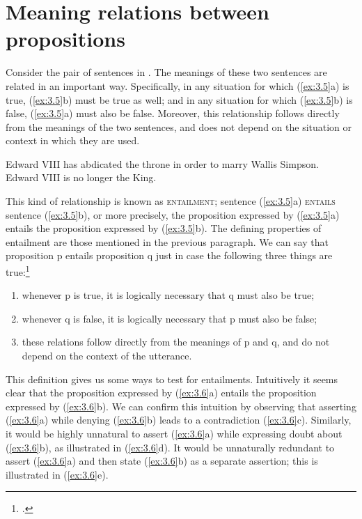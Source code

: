 \section{Meaning relations between propositions}\label{sec:3.3}

Consider the pair of sentences in . The meanings of these two sentences are related in an important way. Specifically, in any situation for which (\ref{ex:3.5}a) is true, (\ref{ex:3.5}b) must be true as well; and in any situation for which (\ref{ex:3.5}b) is false, (\ref{ex:3.5}a) must also be false. Moreover, this relationship follows directly from the meanings of the two sentences, and does not depend on the situation or context in which they are used.


\ea \label{ex:3.5}
\ea Edward VIII has abdicated the throne in order to marry Wallis Simpson.\\
\ex Edward VIII is no longer the King.
                       \z
\z


This kind of relationship is known as \textsc{entailment}; sentence (\ref{ex:3.5}a) \textsc{entails} sentence (\ref{ex:3.5}b), or more precisely, the proposition expressed by (\ref{ex:3.5}a) entails the proposition expressed by (\ref{ex:3.5}b). The defining properties of entailment are those mentioned in the previous paragraph. We can say that proposition p entails proposition q just in case the following three things are true:\footnote{\citet[29]{Cruse2000}.}


\begin{enumerate}[label=(\alph*)]
 \item whenever p is true, it is logically necessary that q must also be true;
 \item whenever q is false, it is logically necessary that p must also be false;
 \item these relations follow directly from the meanings of p and q, and do not depend on the context of the utterance.
\end{enumerate}

This definition gives us some ways to test for entailments. Intuitively it seems clear that the proposition expressed by (\ref{ex:3.6}a) entails the proposition expressed by (\ref{ex:3.6}b). We can confirm this intuition by observing that asserting (\ref{ex:3.6}a) while denying (\ref{ex:3.6}b) leads to a contradiction (\ref{ex:3.6}c). Similarly, it would be highly unnatural to assert (\ref{ex:3.6}a) while expressing doubt about (\ref{ex:3.6}b), as illustrated in (\ref{ex:3.6}d). It would be unnaturally redundant to assert (\ref{ex:3.6}a) and then state (\ref{ex:3.6}b) as a separate assertion; this is illustrated in (\ref{ex:3.6}e).


